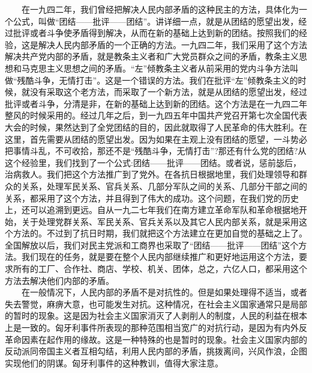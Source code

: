 \documentclass[cn,11pt,chinese]{elegantbook}
\begin{document}
　　在一九四二年，我们曾经把解决人民内部矛盾的这种民主的方法，具体化为一个公式，叫做“团结——批评——团结”。讲详细一点，就是从团结的愿望出发，经过批评或者斗争使矛盾得到解决，从而在新的基础上达到新的团结。按照我们的经验，这是解决人民内部矛盾的一个正确的方法。一九四二年，我们采用了这个方法解决共产党内部的矛盾，就是教条主义者和广大党员群众之间的矛盾，教条主义思想和马克思主义思想之间的矛盾。“左”倾教条主义者从前采用的党内斗争方法叫做“残酷斗争，无情打击”。这是一个错误的方法。我们在批评“左”倾教条主义的时候，就没有采取这个老方法，而采取了一个新方法，就是从团结的愿望出发，经过批评或者斗争，分清是非，在新的基础上达到新的团结。这个方法是在一九四二年整风的时候采用的。经过几年之后，到一九四五年中国共产党召开第七次全国代表大会的时候，果然达到了全党团结的目的，因此就取得了人民革命的伟大胜利。在这里，首先需要从团结的愿望出发。因为如果在主观上没有团结的愿望，一斗势必把事情斗乱，不可收拾，那还不是“残酷斗争，无情打击”?那还有什么党的团结?从这个经验里，我们找到了一个公式:团结——批评——团结。或者说，惩前毖后，治病救人。我们把这个方法推广到了党外。在各抗日根据地里，我们处理领导和群众的关系，处理军民关系、官兵关系、几部分军队之间的关系、几部分干部之间的关系，都采用了这个方法，并且得到了伟大的成功。这个问题，在我们党的历史上，还可以追溯到更远。自从一九二七年我们在南方建立革命军队和革命根据地开始，关于处理党群关系、军民关系、官兵关系以及其它人民内部关系，就是采用这个方法的。不过到了抗日时期，我们就把这个方法建立在更加自觉的基础之上了。全国解放以后，我们对民主党派和工商界也采取了“团结——批评——团结”这个方法。我们现在的任务，就是要在整个人民内部继续推广和更好地运用这个方法，要求所有的工厂、合作社、商店、学校、机关、团体，总之，六亿人口，都采用这个方法去解决他们内部的矛盾。\\
　　在一般情况下，人民内部的矛盾不是对抗性的。但是如果处理得不适当，或者失去警觉，麻痹大意，也可能发生对抗。这种情况，在社会主义国家通常只是局部的暂时的现象。这是因为社会主义国家消灭了人剥削人的制度，人民的利益在根本上是一致的。匈牙利事件所表现的那种范围相当宽广的对抗行动，是因为有内外反革命因素在起作用的缘故。这是一种特殊的也是暂时的现象。社会主义国家内部的反动派同帝国主义者互相勾结，利用人民内部的矛盾，挑拨离间，兴风作浪，企图实现他们的阴谋。匈牙利事件的这种教训，值得大家注意。\\
\end{document}
